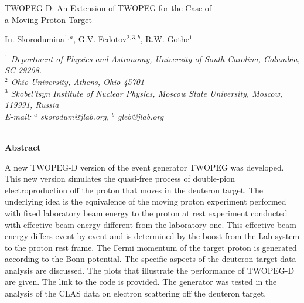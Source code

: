 \noindent\begin{minipage}{\textwidth}
\begin{center}
\thispagestyle{empty}
\vspace{0.5cm}
{ \Large{TWOPEG-D: An Extension of TWOPEG for the Case of\\ a Moving Proton Target}}\\
\vspace{1cm}

{\large Iu. Skorodumina$^{1, a}$, G.V. Fedotov$^{2, 3, b}$,  R.W. Gothe$^{1}$} \\[16pt]

\parbox{.86\textwidth}{\centering\footnotesize\it
$^1$ Department of Physics and Astronomy, University of South Carolina, Columbia, SC 29208.\\
$^2$ Ohio University, Athens, Ohio  45701\\
$^3$ Skobel'tsyn Institute of Nuclear Physics, Moscow State University, Moscow, 119991, Russia\\
E-mail: $^a$ skorodum@jlab.org, $^b$ gleb@jlab.org}\\


\vspace{2cm}
{\bf Abstract}\\[9pt]

\end{center}
{A new TWOPEG-D version of the event generator TWOPEG was developed. This new version simulates the quasi-free process of double-pion electroproduction off the proton that moves in the deuteron target. The underlying idea is the equivalence of the moving proton experiment performed with fixed laboratory beam energy to the proton at rest experiment conducted with effective beam energy different from the laboratory one. This effective beam energy differs event by event and is determined by the boost from the Lab system to the proton rest frame. The Fermi momentum of the target proton is generated according to the Bonn potential. The specific aspects of the deuteron target data analysis are discussed. The plots that illustrate the performance of TWOPEG-D are given. The link to the code is provided. The generator was tested in the analysis of the CLAS data on electron scattering off the deuteron target.}


\end{minipage}
